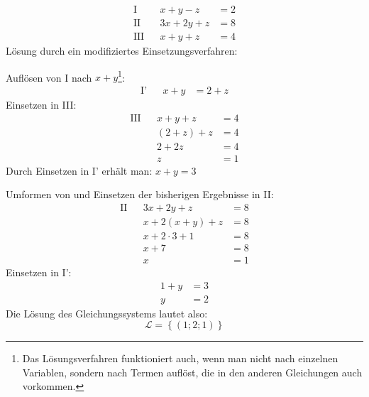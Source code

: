 \begin{bsp}
 \begin{align*}
  \text{I} && x+y-z &= 2\\
  \text{II} && 3x+2y+z &= 8\\
  \text{III} && x+y+z &= 4
 \end{align*}
 Lösung durch ein modifiziertes Einsetzungsverfahren:
 
 Auflösen von I nach \(x+y\)\footnote{Das Lösungsverfahren funktioniert auch, wenn man nicht nach einzelnen Variablen, sondern nach Termen auflöst, die in den anderen Gleichungen auch vorkommen.}:
 \begin{align*}
  \text{I'}&& x+y &= 2+z
 \end{align*}
 Einsetzen in III:
 \begin{align*}
 \text{III} && x+y+z &= 4\\
  &&(2+z) +z &= 4 \\
  &&2 +2z &= 4  \\
  &&    z&= 1
 \end{align*}
 Durch Einsetzen in I' erhält man: \(x+y=3\)

 Umformen von und Einsetzen der bisherigen Ergebnisse in II:
 \begin{align*}
  \text{II} && 3x+2y+z &= 8\\
   && x+2(x+y)+z &= 8\\
   && x+2\cdot 3 +1 &= 8 \\
   && x+7 &= 8 \\
   && x&= 1
 \end{align*}
 Einsetzen in I':
 \begin{align*}
  1+y &=3\\
  y&= 2
 \end{align*}
 Die Lösung des Gleichungssystems lautet also:
 \begin{equation*}
  \mathcal{L} = \left\lbrace (1;2;1) \right\rbrace
 \end{equation*}

\end{bsp}


\begin{regel}[Additionsverfahren]
 
\end{regel}

